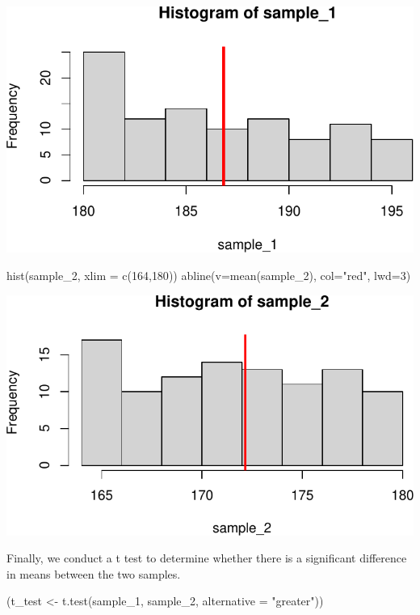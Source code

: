 \documentclass[
  letterpaper,
  DIV=11,
  numbers=noendperiod]{scrartcl}
\newenvironment{Shaded}{\begin{snugshade}}{\end{snugshade}}
\newcommand{\AttributeTok}[1]{\textcolor[rgb]{0.40,0.45,0.13}{#1}}
\newcommand{\DecValTok}[1]{\textcolor[rgb]{0.68,0.00,0.00}{#1}}
\newcommand{\FunctionTok}[1]{\textcolor[rgb]{0.28,0.35,0.67}{#1}}
\newcommand{\NormalTok}[1]{\textcolor[rgb]{0.00,0.23,0.31}{#1}}
\newcommand{\OtherTok}[1]{\textcolor[rgb]{0.00,0.23,0.31}{#1}}
\newcommand{\StringTok}[1]{\textcolor[rgb]{0.13,0.47,0.30}{#1}}
\begin{document}
\includegraphics{stats_review_files/figure-pdf/unnamed-chunk-20-1.pdf}

\begin{Shaded}
\begin{Highlighting}[]
\FunctionTok{hist}\NormalTok{(sample\_2, }\AttributeTok{xlim =} \FunctionTok{c}\NormalTok{(}\DecValTok{164}\NormalTok{,}\DecValTok{180}\NormalTok{))}
\FunctionTok{abline}\NormalTok{(}\AttributeTok{v=}\FunctionTok{mean}\NormalTok{(sample\_2), }\AttributeTok{col=}\StringTok{"red"}\NormalTok{, }\AttributeTok{lwd=}\DecValTok{3}\NormalTok{)}
\end{Highlighting}
\end{Shaded}

\includegraphics{stats_review_files/figure-pdf/unnamed-chunk-21-1.pdf}

Finally, we conduct a t test to determine whether there is a significant
difference in means between the two samples.

\begin{Shaded}
\begin{Highlighting}[]
\NormalTok{(t\_test }\OtherTok{\textless{}{-}} \FunctionTok{t.test}\NormalTok{(sample\_1, sample\_2, }\AttributeTok{alternative =} \StringTok{"greater"}\NormalTok{))}
\end{Highlighting}
\end{Shaded}
\end{document}
